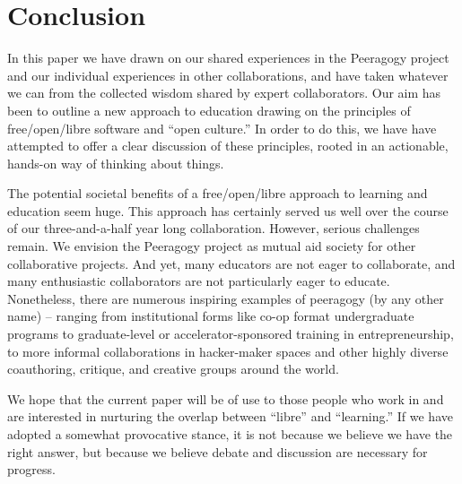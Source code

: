 \section{Conclusion}\label{sec:Conclusion}

In this paper we have drawn on our shared experiences in the Peeragogy
project and our individual experiences in other collaborations, and
have taken whatever we can from the collected wisdom shared by expert
collaborators.  Our aim has been to outline a new approach to
education drawing on the principles of free/open/libre software and
``open culture.''  In order to do this, we have have attempted to
offer a clear discussion of these principles, rooted in an actionable,
hands-on way of thinking about things.

The potential societal benefits of a free/open/libre approach to
learning and education seem huge.  This approach has certainly served
us well over the course of our three-and-a-half year long
collaboration.  However, serious challenges remain.  We envision the
Peeragogy project as mutual aid society for other collaborative
projects.  And yet, many educators are not eager to collaborate, and
many enthusiastic collaborators are not particularly eager to educate.
Nonetheless, there are numerous inspiring examples of peeragogy (by
any other name) -- ranging from institutional forms like co-op format
undergraduate programs to graduate-level or accelerator-sponsored
training in entrepreneurship, to more informal collaborations in
hacker-maker spaces and other highly diverse coauthoring, critique,
and creative groups around the world.

We hope that the current paper will be of use to those people who work
in and are interested in nurturing the overlap between ``libre'' and
``learning.''  If we have adopted a somewhat provocative stance, it is
not because we believe we have the right answer, but because we
believe debate and discussion are necessary for progress.


